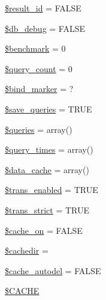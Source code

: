 \begin{DoxyCompactItemize}
\item 
\mbox{\hyperlink{class_c_i___d_b__driver_a0ebacb40e3b6f8bf33d3de0f2cc71474}{\$result\+\_\+id}} = F\+A\+L\+SE
\item 
\mbox{\hyperlink{class_c_i___d_b__driver_a2c1bc80cc98589e419a6c535e53735de}{\$db\+\_\+debug}} = F\+A\+L\+SE
\item 
\mbox{\hyperlink{class_c_i___d_b__driver_ac75dbf878e2ceec25d2abe6730855f6b}{\$benchmark}} = 0
\item 
\mbox{\hyperlink{class_c_i___d_b__driver_aa7f7fc5b08bc2c3626ea7065d50c8847}{\$query\+\_\+count}} = 0
\item 
\mbox{\hyperlink{class_c_i___d_b__driver_a253af4ebf23051f23690926079f4285d}{\$bind\+\_\+marker}} = \textquotesingle{}?\textquotesingle{}
\item 
\mbox{\hyperlink{class_c_i___d_b__driver_a083a278ea2075824db1db85edaa8e0a8}{\$save\+\_\+queries}} = T\+R\+UE
\item 
\mbox{\hyperlink{class_c_i___d_b__driver_a576b05de2f452e4cce4e3de12667ba0f}{\$queries}} = array()
\item 
\mbox{\hyperlink{class_c_i___d_b__driver_a060b2893433dfc037803cf6541420f5f}{\$query\+\_\+times}} = array()
\item 
\mbox{\hyperlink{class_c_i___d_b__driver_aab3007e30adbaf71d06218aa6c90e384}{\$data\+\_\+cache}} = array()
\item 
\mbox{\hyperlink{class_c_i___d_b__driver_a450683d6d87929985766484b2f6a9e7b}{\$trans\+\_\+enabled}} = T\+R\+UE
\item 
\mbox{\hyperlink{class_c_i___d_b__driver_ae3111155f1f3ec59fe667b90dafb179f}{\$trans\+\_\+strict}} = T\+R\+UE
\item 
\mbox{\hyperlink{class_c_i___d_b__driver_ab29a8930111a4f2a57987a9031982c34}{\$cache\+\_\+on}} = F\+A\+L\+SE
\item 
\mbox{\hyperlink{class_c_i___d_b__driver_a01f61437be9e9a04ee228f5d455265db}{\$cachedir}} = \textquotesingle{}\textquotesingle{}
\item 
\mbox{\hyperlink{class_c_i___d_b__driver_a3da421c22206e24614dc73c9536ff605}{\$cache\+\_\+autodel}} = F\+A\+L\+SE
\item 
\mbox{\hyperlink{class_c_i___d_b__driver_a54f3ab89da1323e5680116d8e9e94b83}{\$\+C\+A\+C\+HE}}
\end{DoxyCompactItemize}
